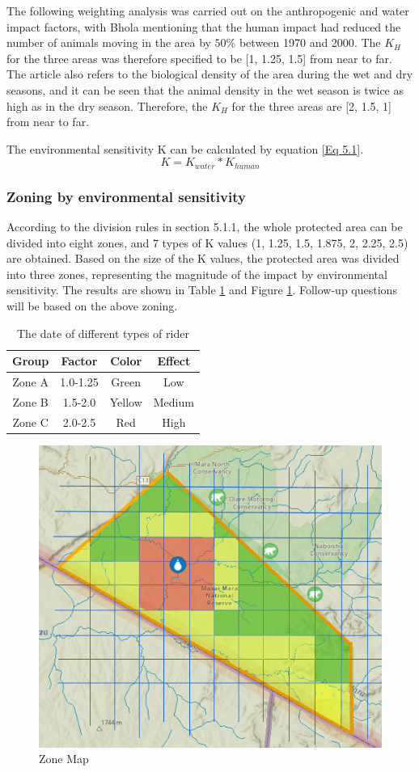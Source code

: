 \documentclass{mcmthesis}
\numberwithin{figure}{section}
\numberwithin{table}{section}
\numberwithin{equation}{section}
\begin{document}
The following weighting analysis was carried out on the anthropogenic and water impact factors, with Bhola mentioning that the human impact had reduced the number of animals moving in the area by $50\%$ between 1970 and 2000\cite{1}. The $K_H$ for the three areas was therefore specified to be [1, 1.25, 1.5] from near to far. The article also refers to the biological density of the area during the wet and dry seasons, and it can be seen that the animal density in the wet season is twice as high as in the dry season. Therefore, the $K_H$ for the three areas are [2, 1.5, 1] from near to far. 


The environmental sensitivity K can be calculated by equation \ref{Eq 5.1}.
\begin{equation}
K=K_{water}*K_{human}
\label{Eq 5.1}
\end{equation}

\subsubsection{Zoning by environmental sensitivity}
According to the division rules in section 5.1.1, the whole protected area can be divided into eight zones, and 7 types of K values (1, 1.25, 1.5, 1.875, 2, 2.25, 2.5) are obtained. Based on the size of the K values, the protected area was divided into three zones, representing the magnitude of the impact by environmental sensitivity. The results are shown in Table \ref{T 5.1} and Figure \ref{F 5.3}. Follow-up questions will be based on the above zoning.

\begin{table}[htp]
	\centering
	\normalsize
	\renewcommand\arraystretch{1.5}
    \caption{The date of different types of rider}
    \label{T 5.1}
    \setlength{\tabcolsep}{12mm}
\begin{tabular}{@{}cccc@{}}
	\toprule
	\textbf{Group} & \textbf{Factor} & \textbf{Color} & \textbf{Effect} \\ \midrule
	Zone A        & 1.0-1.25        & Green          & Low             \\
	Zone B        & 1.5-2.0         & Yellow         & Medium          \\
	Zone C        & 2.0-2.5         & Red            & High            \\ \bottomrule
\end{tabular}
\end{table}

\begin{figure}
	\centering
	\includegraphics[width=0.5\linewidth]{"figures/F5.3 Zoneing"}
	\caption{Zone Map}
	\label{F 5.3}
\end{figure}
\end{document}
